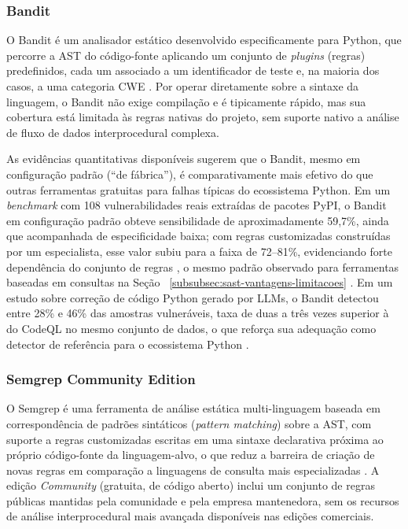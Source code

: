 \subsubsection{Bandit}\label{subsubsec:bandit}
O Bandit é um analisador estático desenvolvido especificamente para Python, que percorre a AST do código-fonte aplicando um conjunto de \textit{plugins} (regras) predefinidos, cada um associado a um identificador de teste e, na maioria dos casos, a uma categoria CWE \cite{Dalaq2025SASTSLR}. Por operar diretamente sobre a sintaxe da linguagem, o Bandit não exige compilação e é tipicamente rápido, mas sua cobertura está limitada às regras nativas do projeto, sem suporte nativo a análise de fluxo de dados interprocedural complexa.

As evidências quantitativas disponíveis sugerem que o Bandit, mesmo em configuração padrão (``de fábrica''), é comparativamente mais efetivo do que outras ferramentas gratuitas para falhas típicas do ecossistema Python. Em um \textit{benchmark} com 108 vulnerabilidades reais extraídas de pacotes PyPI, o Bandit em configuração padrão obteve sensibilidade de aproximadamente 59,7\%, ainda que acompanhada de especificidade baixa; com regras customizadas construídas por um especialista, esse valor subiu para a faixa de 72–81\%, evidenciando forte dependência do conjunto de regras , o mesmo padrão observado para ferramentas baseadas em consultas na Seção ~\ref{subsubsec:sast-vantagens-limitacoes} \cite{Marquer2026SAGA}. Em um estudo sobre correção de código Python gerado por LLMs, o Bandit detectou entre 28\% e 46\% das amostras vulneráveis, taxa de duas a três vezes superior à do CodeQL no mesmo conjunto de dados, o que reforça sua adequação como detector de referência para o ecossistema Python \cite{Alrashedy2025FDSP}.

\subsubsection{Semgrep Community Edition}\label{subsubsec:semgrep-ce}
O Semgrep é uma ferramenta de análise estática multi-linguagem baseada em correspondência de padrões sintáticos (\textit{pattern matching}) sobre a AST, com suporte a regras customizadas escritas em uma sintaxe declarativa próxima ao próprio código-fonte da linguagem-alvo, o que reduz a barreira de criação de novas regras em comparação a linguagens de consulta mais especializadas \cite{Dalaq2025SASTSLR}. A edição \textit{Community} (gratuita, de código aberto) inclui um conjunto de regras públicas mantidas pela comunidade e pela empresa mantenedora, sem os recursos de análise interprocedural mais avançada disponíveis nas edições comerciais.

